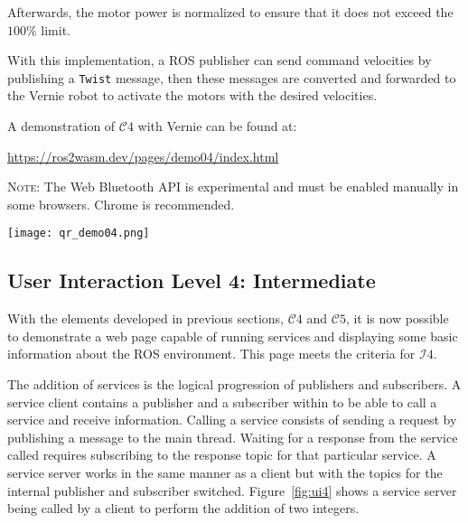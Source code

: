         Afterwards, the motor power is normalized to ensure that it does not exceed the $100\%$ limit. 
        
        With this implementation, a \ac{ROS} publisher can send command velocities by publishing a \texttt{Twist} message, then these messages are converted and forwarded to the Vernie robot to activate the motors with the desired velocities.

        \vspace{1em}
        \begin{tcolorbox}[title=Example 7]
            \begin{minipage}[t]{0.87\linewidth}
                \vspace*{0.5\baselineskip}
                A demonstration of $\mathcal{C}4$ with Vernie can be found at:
                
                \href{https://ros2wasm.dev/pages/demo04/index.html}{\textsf{https://ros2wasm.dev/pages/demo04/index.html}}

                \textsc{Note:} The Web Bluetooth \ac{API} is experimental and must be enabled manually in some browsers. Chrome is recommended.
            \end{minipage}\hfill%
            \begin{minipage}[t]{0.1\linewidth}
                \vspace{14pt}
                \texttt{[image: qr\_demo04.png]}
            \end{minipage}
        \end{tcolorbox}



        \subsection{User Interaction Level 4: Intermediate}

        With the elements developed in previous sections, $\mathcal{C}4$ and $\mathcal{C}5$, it is now possible to demonstrate a web page capable of running services and displaying some basic information about the \ac{ROS} environment. This page meets the criteria for $\mathcal{I}4$.

        The addition of services is the logical progression of publishers and subscribers. A service client contains a publisher and a subscriber within to be able to call a service and receive information. Calling a service consists of sending a request by publishing a message to the main thread. Waiting for a response from the service called requires subscribing to the response topic for that particular service. A service server works in the same manner as a client but with the topics for the internal publisher and subscriber switched. Figure~\ref{fig:ui4} shows a service server being called by a client to perform the addition of two integers.


